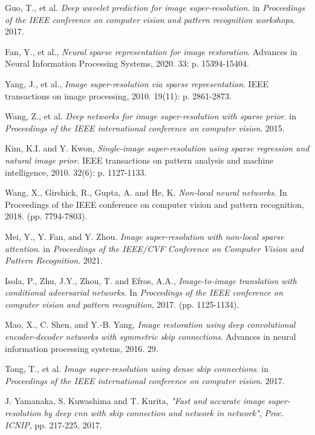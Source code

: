 \documentclass{ieeeaccess}
\begin{document}
\begin{thebibliography}{00}
 Guo, T., et al. \textit{Deep wavelet prediction for image super-resolution}. in \textit{Proceedings of the IEEE conference on computer vision and pattern recognition workshops}. 2017.

 Fan, Y., et al., \textit{Neural sparse representation for image restoration}. Advances in Neural Information Processing Systems, 2020. 33: p. 15394-15404.

 Yang, J., et al., \textit{Image super-resolution via sparse representation}. IEEE transactions on image processing, 2010. 19(11): p. 2861-2873.

 Wang, Z., et al. \textit{Deep networks for image super-resolution with sparse prior}. in \textit{Proceedings of the IEEE international conference on computer vision}. 2015.

 Kim, K.I. and Y. Kwon, \textit{Single-image super-resolution using sparse regression and natural image prior}. IEEE transactions on pattern analysis and machine intelligence, 2010. 32(6): p. 1127-1133.

 Wang, X., Girshick, R., Gupta, A. and He, K. \textit{Non-local neural networks}. In Proceedings of the IEEE conference on computer vision and pattern recognition, 2018. (pp. 7794-7803).

 Mei, Y., Y. Fan, and Y. Zhou. \textit{Image super-resolution with non-local sparse attention}. in \textit{Proceedings of the IEEE/CVF Conference on Computer Vision and Pattern Recognition}. 2021.

 Isola, P., Zhu, J.Y., Zhou, T. and Efros, A.A., \textit{Image-to-image translation with conditional adversarial networks}. In \textit{Proceedings of the IEEE conference on computer vision and pattern recognition}, 2017.  (pp. 1125-1134).

 Mao, X., C. Shen, and Y.-B. Yang, \textit{Image restoration using deep convolutional encoder-decoder networks with symmetric skip connections}. Advances in neural information processing systems, 2016. 29.

 Tong, T., et al. \textit{Image super-resolution using dense skip connections}. in \textit{Proceedings of the IEEE international conference on computer vision}. 2017.

 J. Yamanaka, S. Kuwashima and T. Kurita, \textit{"Fast and accurate image super-resolution by deep cnn with skip connection and network in network"}, \textit{Proc. ICNIP}, pp. 217-225, 2017.


\end{thebibliography}
\end{document}
